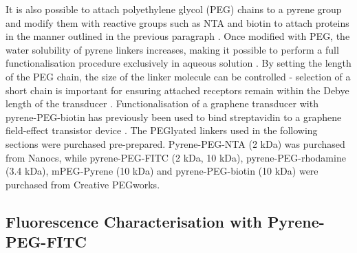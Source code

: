 \documentclass[
  a4paper,
]{scrbook}
\begin{document}
It is also possible to attach polyethylene glycol (PEG) chains to a
pyrene group and modify them with reactive groups such as NTA and biotin
to attach proteins in the manner outlined in the previous paragraph
\autocite{Hermanson2013-18,Meran2018}. Once modified with PEG, the water
solubility of pyrene linkers increases, making it possible to perform a
full functionalisation procedure exclusively in aqueous solution
\autocite{Hermanson2013-18}. By setting the length of the PEG chain, the
size of the linker molecule can be controlled - selection of a short
chain is important for ensuring attached receptors remain within the
Debye length of the transducer \autocite{Shkodra2021}. Functionalisation
of a graphene transducer with pyrene-PEG-biotin has previously been used
to bind streptavidin to a graphene field-effect transistor device
\autocite{Miki2019}. The PEGlyated linkers used in the following
sections were purchased pre-prepared. Pyrene-PEG-NTA (2 kDa) was
purchased from Nanocs, while pyrene-PEG-FITC (2 kDa, 10 kDa),
pyrene-PEG-rhodamine (3.4 kDa), mPEG-Pyrene (10 kDa) and
pyrene-PEG-biotin (10 kDa) were purchased from Creative PEGworks.

\hypertarget{sec-PPF-fluorescence-characterisation}{%
\subsection{Fluorescence Characterisation with
Pyrene-PEG-FITC}\label{sec-PPF-fluorescence-characterisation}}
\end{document}
